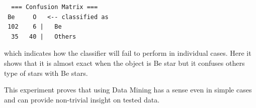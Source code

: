 \begin{lstlisting}
  === Confusion Matrix ===
 Be     O   <-- classified as
 102    6 |   Be
  35   40 |   Others
\end{lstlisting}

which indicates how the classifier will fail to perform in individual
cases. Here it shows that it is almost exact when the object is Be
star but it confuses others type of stars with Be stars.

This experiment proves that using Data Mining has a sense even in
simple cases and can provide non-trivial insight on tested data.






